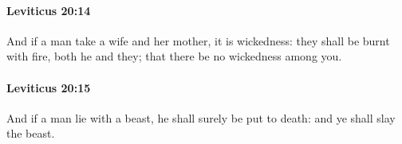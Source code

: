 		\paragraph{Leviticus 20:14} %
			\label{LEVITICUS-20-14}

			And if a man take a wife and her mother, it is wickedness: they shall be burnt with fire, both he and they; that there be no wickedness among you.


		\paragraph{Leviticus 20:15} %
			\label{LEVITICUS-20-15}

			And if a man lie with a beast, he shall surely be put to death: and ye shall slay the beast.


